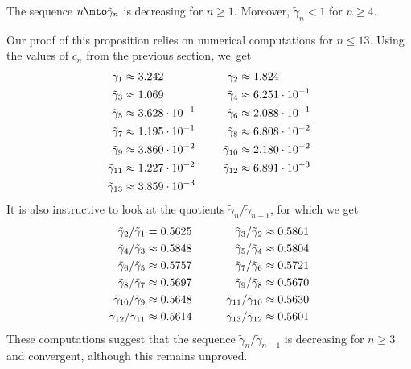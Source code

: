 \begin{proposition}\label{gammatildemono}
The sequence $n\mto \tilde\gamma_n$ is decreasing for $n\geq 1$. Moreover, $\tilde\gamma_n<1$ for $n\geq 4$.
\end{proposition}

Our proof of this proposition relies on numerical computations for $n\leq 13$. Using the values of $c_n$ from the previous section, we~get
\[
\begin{aligned}
\tilde\gamma_1 & \approx 3.242&
\tilde\gamma_2 & \approx 1.824\\
\tilde\gamma_3 & \approx 1.069&
\tilde\gamma_4 &\approx 6.251 \cdot 10^{-1} \\
\tilde\gamma_5 &\approx 3.628 \cdot 10^{-1} &
\tilde\gamma_6 & \approx  2.088 \cdot 10^{-1} \\
\tilde\gamma_7 & \approx 1.195\cdot 10^{-1} &
\tilde\gamma_8 & \approx  6.808\cdot 10^{-2} \\
\tilde\gamma_9 & \approx  3.860\cdot10^{-2} &
\tilde\gamma_{10} & \approx 2.180 \cdot 10^{-2} \\
\tilde\gamma_{11} &\approx 1.227\cdot 10^{-2} &
\tilde\gamma_{12} &\approx 6.891\cdot 10^{-3}  \\
\tilde\gamma_{13} & \approx 3.859\cdot 10^{-3}&\hspace*{1cm}
\end{aligned}
\]
It is also instructive to look at the quotients $\tilde\gamma_n/\tilde\gamma_{n-1}$, for which we get
\[
\begin{aligned}
\tilde\gamma_2/\tilde\gamma_1 & =  0.5625 &\hspace*{1cm}
\tilde\gamma_3/\tilde\gamma_2 & \approx 0.5861 \\
\tilde\gamma_4/\tilde\gamma_3 & \approx 0.5848 & \tilde\gamma_5/\tilde\gamma_4 & \approx 0.5804 \\
\tilde\gamma_6/\tilde\gamma_5 & \approx 0.5757 &
\tilde\gamma_7/\tilde\gamma_6& \approx 0.5721 \\
\tilde\gamma_8/\tilde\gamma_7& \approx0.5697&
\tilde\gamma_9/\tilde\gamma_8& \approx0.5670\\
\tilde\gamma_{10}/\tilde\gamma_9& \approx 0.5648&
\tilde\gamma_{11}/\tilde\gamma_{10}& \approx0.5630\\
\tilde\gamma_{12}/\tilde\gamma_{11}& \approx0.5614&
\tilde\gamma_{13}/\tilde\gamma_{12}& \approx0.5601
\end{aligned}
\]
These computations suggest that the sequence $\tilde\gamma_n/\tilde\gamma_{n-1}$ is decreasing for $n\geq 3$ and convergent, although this remains unproved.

